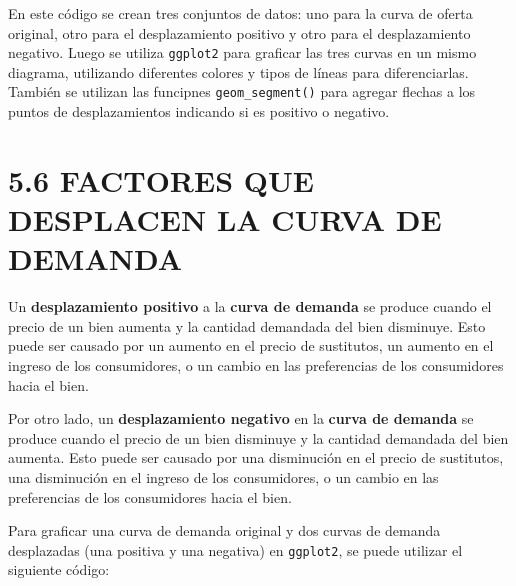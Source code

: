 \documentclass[
  spanish,
  12pt,
]{book}
\begin{document}
En este código se crean tres conjuntos de datos: uno para la curva de
oferta original, otro para el desplazamiento positivo y otro para el
desplazamiento negativo. Luego se utiliza \texttt{ggplot2} para graficar
las tres curvas en un mismo diagrama, utilizando diferentes colores y
tipos de líneas para diferenciarlas. También se utilizan las funcipnes
\texttt{geom\_segment()} para agregar flechas a los puntos de
desplazamientos indicando si es positivo o negativo.

\section{5.6 FACTORES QUE DESPLACEN LA CURVA DE
DEMANDA}\label{factores-que-desplacen-la-curva-de-demanda}

Un \textbf{desplazamiento positivo} a la \textbf{curva de demanda} se
produce cuando el precio de un bien aumenta y la cantidad demandada del
bien disminuye. Esto puede ser causado por un aumento en el precio de
sustitutos, un aumento en el ingreso de los consumidores, o un cambio en
las preferencias de los consumidores hacia el bien.

Por otro lado, un \textbf{desplazamiento negativo} en la \textbf{curva
de demanda} se produce cuando el precio de un bien disminuye y la
cantidad demandada del bien aumenta. Esto puede ser causado por una
disminución en el precio de sustitutos, una disminución en el ingreso de
los consumidores, o un cambio en las preferencias de los consumidores
hacia el bien.

Para graficar una curva de demanda original y dos curvas de demanda
desplazadas (una positiva y una negativa) en \texttt{ggplot2}, se puede
utilizar el siguiente código:
\end{document}
